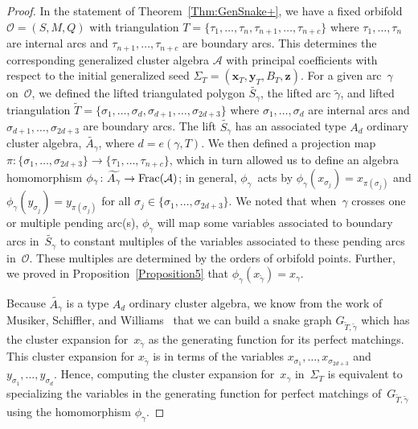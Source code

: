 \begin{proof} In the statement of Theorem~\ref{Thm:GenSnake+}, we have a fixed orbifold $\mathcal{O} = (S,M,Q)$ with triangulation $T = \{\tau_1,\dots,\tau_n,\tau_{n+1},\dots,\tau_{n+c} \}$ where $\tau_1,\dots,\tau_n$ are internal arcs and $\tau_{n+1},\dots,\tau_{n+c}$ are boundary arcs. This determines the corresponding generalized cluster algebra $\mathcal{A}$ with principal coefficients with respect to the initial generalized seed $\Sigma_T = (\mathbf{x}_T,\mathbf{y}_T,B_T,\mathbf{z})$. For a given arc~$\gamma$ on~$\mathcal{O}$, we defined the lifted triangulated polygon $\widetilde{S_{\gamma}}$, the lifted arc $\widetilde{\gamma}$, and lifted triangulation $\widetilde{T} = \{\sigma_1, \dots, \sigma_d, \sigma_{d+1}, \dots, \sigma_{2d+3} \}$ where $\sigma_1,\dots,\sigma_d$ are internal arcs and $\sigma_{d+1},\dots,\sigma_{2d+3}$ are boundary arcs. The lift $\widetilde{S_\gamma}$ has an associated type $A_d$ ordinary cluster algebra, $\widetilde{A_\gamma}$, where $d = e(\gamma,T)$. We then defined a projection map $\pi\colon \{ \sigma_1,\dots,\sigma_{2d+3} \} \rightarrow \{ \tau_1,\dots,\tau_{n+c} \}$, which in turn allowed us to define an algebra homomorphism $\phi_\gamma\colon \widetilde{A_\gamma} \rightarrow {\rm Frac}(\mathcal{A})$; in general, $\phi_\gamma$~acts by $\phi_\gamma(x_{\sigma_j}) = x_{\pi(\sigma_{j})}$ and $\phi_\gamma(y_{\sigma_j}) = y_{\pi(\sigma_{j})}$ for all $\sigma_j \in \{\sigma_1, \dots, \sigma_{2d+3} \}$. We noted that when~$\gamma$ crosses one or multiple pending arc(s), $\phi_\gamma$ will map some variables associated to boundary arcs in~$\widetilde{S_\gamma}$ to constant multiples of the variables associated to these pending arcs in~$\mathcal{O}$. These multiples are determined by the orders of orbifold points.
Further, we proved in Proposition~\ref{Proposition5} that $\phi_\gamma(x_{\widetilde{\gamma}}) = x_{\gamma}$.

Because $\widetilde{A_\gamma}$ is a type $A_d$ ordinary cluster algebra, we know from the work of Musiker, Schiffler, and Williams~\cite{MSW} that we can build a snake graph $G_{\widetilde{T},\widetilde{\gamma}}$ which has the cluster expansion for~$x_{\widetilde{\gamma}}$ as the generating function for its perfect matchings. This cluster expansion for $x_{\widetilde{\gamma}}$ is in terms of the variables $x_{\sigma_1}, \dots, x_{\sigma_{2d+3}}$ and $y_{\sigma_1},\dots, y_{\sigma_{d}}$. Hence, computing the cluster expansion for~$x_\gamma$ in~$\Sigma_T$ is equivalent to specializing the variables in the generating function for perfect matchings of~$G_{\widetilde{T},\widetilde{\gamma}}$ using the homomorphism $\phi_\gamma$.


\end{proof}
